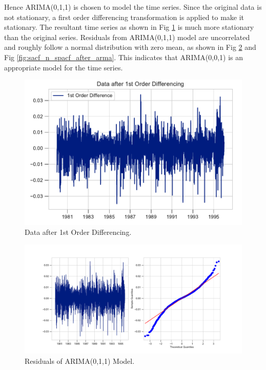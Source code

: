 \documentclass[]{article}
\begin{document}
Hence ARIMA(0,1,1) is chosen to model the time series. Since the original data is not stationary, a first order differencing transformation is applied to make it stationary. The resultant time series as shown in Fig \ref{fig:data_1_d} is much more stationary than the original series. Residuals from ARIMA(0,1,1) model are uncorrelated and roughly follow a normal distribution with zero mean, as shown in Fig \ref{fig:res_after_arma} and Fig \ref{fig:sacf_n_spacf_after_arma}. This indicates that ARIMA(0,0,1) is an appropriate model for the time series. 
%
\begin{figure}[ht]
	\centering
	\includegraphics[width=1\columnwidth]{../Figures/data_1_d.pdf}
	\caption{Data after 1st Order Differencing.}
	\label{fig:data_1_d}
\end{figure}
%
%
\begin{figure}[ht]
	\centering
	\includegraphics[width=1\columnwidth]{../Figures/res_after_arma.pdf}
	\caption{Residuals of ARIMA(0,1,1) Model.}
	\label{fig:res_after_arma}
\end{figure}
%
%
\end{document}
